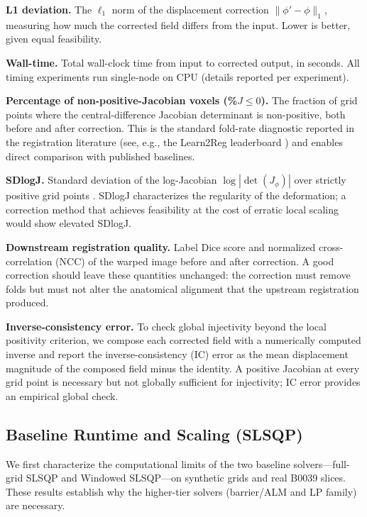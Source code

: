 \documentclass[lettersize,journal]{IEEEtran}
\begin{document}
\textbf{L1 deviation.} The $\ell_1$ norm of the displacement correction $\|\phi' - \phi\|_1$, measuring how much the corrected field differs from the input. Lower is better, given equal feasibility.

\textbf{Wall-time.} Total wall-clock time from input to corrected output, in seconds. All timing experiments run single-node on CPU (details reported per experiment).

\textbf{Percentage of non-positive-Jacobian voxels (\%$J{\leq}0$).} The fraction of grid points where the central-difference Jacobian determinant is non-positive, both before and after correction. This is the standard fold-rate diagnostic reported in the registration literature (see, e.g., the Learn2Reg leaderboard \cite{learn2reg2023}) and enables direct comparison with published baselines.

\textbf{SDlogJ.} Standard deviation of the log-Jacobian $\log|\det(J_\phi)|$ over strictly positive grid points \cite{learn2reg2023}. SDlogJ characterizes the regularity of the deformation; a correction method that achieves feasibility at the cost of erratic local scaling would show elevated SDlogJ.

\textbf{Downstream registration quality.} Label Dice score and normalized cross-correlation (NCC) of the warped image before and after correction. A good correction should leave these quantities unchanged: the correction must remove folds but must not alter the anatomical alignment that the upstream registration produced.

\textbf{Inverse-consistency error.} To check global injectivity beyond the local positivity criterion, we compose each corrected field with a numerically computed inverse and report the inverse-consistency (IC) error as the mean displacement magnitude of the composed field minus the identity. A positive Jacobian at every grid point is necessary but not globally sufficient for injectivity; IC error provides an empirical global check.

\subsection{Baseline Runtime and Scaling (SLSQP)}
\label{sec:baseline_runtime}

We first characterize the computational limits of the two baseline solvers—full-grid SLSQP and Windowed SLSQP—on synthetic grids and real B0039 slices. These results establish why the higher-tier solvers (barrier/ALM and LP family) are necessary.
\end{document}
